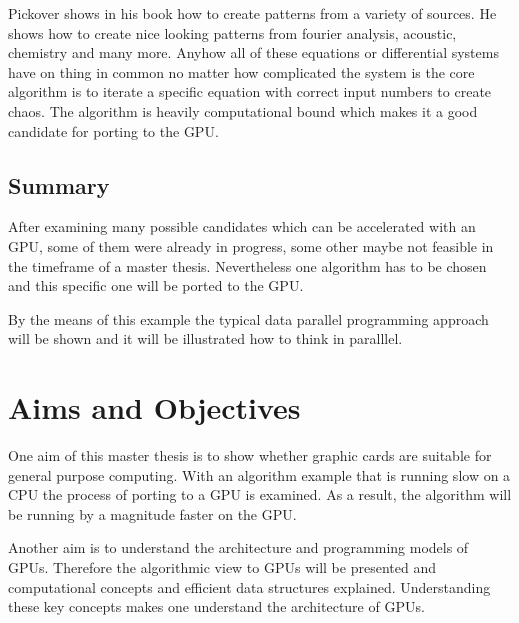 Pickover shows in his book \cite{citeulike:3812233} how to create patterns from
a variety of sources. He shows how to create nice looking patterns from fourier
analysis, acoustic, chemistry and many more. Anyhow all of these equations or
differential systems have on thing in common no matter how complicated the
system is the core algorithm is to iterate a specific equation with correct
input numbers to create chaos. The algorithm is heavily computational bound
which makes it a good candidate for porting to the GPU.
\subsection*{Summary} %
\label{ssub:summary}
After examining many possible candidates which can be accelerated with an GPU,
some of them were already in progress, some other maybe not feasible in the
timeframe of a master thesis. Nevertheless one algorithm has to be chosen and
this specific one will be ported to the GPU.

By the means of this example the typical data parallel programming approach will
be shown and it will be illustrated how to think in paralllel.
\section*{Aims and Objectives} 
\label{sub:aims_and_objectives} 


One aim of this master thesis is to show whether graphic cards are suitable for 
general purpose computing. With an algorithm example that is running slow on a 
CPU the process of porting to a \gls{GPU} is examined. As a result, the algorithm
will be running by a magnitude faster on the GPU. 

Another aim is to understand the architecture and programming models of GPUs.
Therefore the algorithmic view to GPUs will be presented and computational
concepts and efficient data structures explained. Understanding these key
concepts makes one understand the architecture of GPUs.

